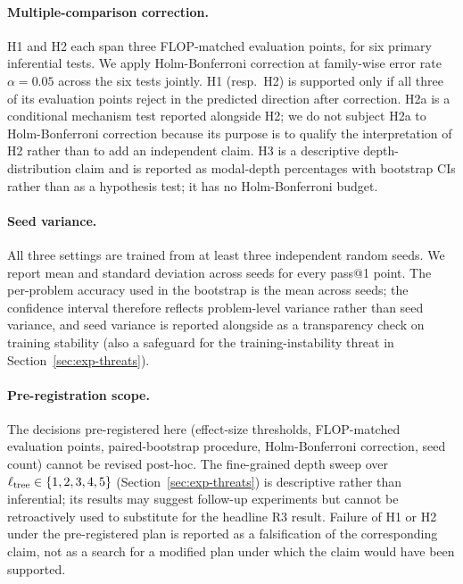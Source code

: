 \paragraph{Multiple-comparison correction.}
H1 and H2 each span three FLOP-matched evaluation points, for six
primary inferential tests. We apply Holm-Bonferroni correction at
family-wise error rate $\alpha = 0.05$ across the six tests jointly.
H1 (resp.\ H2) is supported only if all three of its evaluation
points reject in the predicted direction after correction. H2a is a
conditional mechanism test reported alongside H2; we do not subject
H2a to Holm-Bonferroni correction because its purpose is to qualify
the interpretation of H2 rather than to add an independent claim.
H3 is a descriptive depth-distribution claim and is reported as
modal-depth percentages with bootstrap CIs rather than as a
hypothesis test; it has no Holm-Bonferroni budget.

\paragraph{Seed variance.}
All three settings are trained from at least three independent random
seeds. We report mean and standard deviation across seeds for every
pass@1 point. The per-problem accuracy used in the bootstrap is the
mean across seeds; the confidence interval therefore reflects
problem-level variance rather than seed variance, and seed variance
is reported alongside as a transparency check on training stability
(also a safeguard for the training-instability threat in
Section~\ref{sec:exp-threats}).

\paragraph{Pre-registration scope.}
The decisions pre-registered here (effect-size thresholds, FLOP-matched
evaluation points, paired-bootstrap procedure, Holm-Bonferroni
correction, seed count) cannot be revised post-hoc. The fine-grained
depth sweep over $\ell_{\mathrm{tree}} \in \{1, 2, 3, 4, 5\}$
(Section~\ref{sec:exp-threats}) is descriptive rather than
inferential; its results may suggest follow-up experiments but cannot
be retroactively used to substitute for the headline R3 result.
Failure of H1 or H2 under the pre-registered plan is reported as a
falsification of the corresponding claim, not as a search for a
modified plan under which the claim would have been supported.
